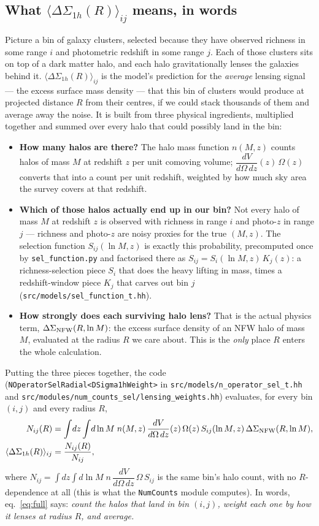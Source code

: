 \documentclass[a4paper, 11pt]{article}
\newcommand{\lnM}{\ln M}
\newcommand{\dVdz}{\dfrac{dV}{d\Omega\,dz}}
\newcommand{\DSnfw}{\Delta\Sigma_{\rm NFW}}
\newcommand{\DSoh}{\Delta\Sigma_{1h}}
\newcommand{\obsij}[1]{\langle \DSoh(#1)\rangle_{ij}}
\begin{document}
\subsection{What \texorpdfstring{$\obsij{R}$}{<DeltaSigma\_1h(R)>\_ij} means, in words}

Picture a bin of galaxy clusters, selected because they have
observed richness in some range $i$ and photometric redshift in
some range $j$. Each of those clusters sits on top of a dark
matter halo, and each halo gravitationally lenses the galaxies
behind it. $\obsij{R}$ is the model's prediction for the
\emph{average} lensing signal --- the excess surface mass density
--- that this bin of clusters would produce at projected distance
$R$ from their centres, if we could stack thousands of them and
average away the noise. It is built from three physical
ingredients, multiplied together and summed over every halo that
could possibly land in the bin:
\begin{itemize}
\item \textbf{How many halos are there?} The halo mass function
      $n(M,z)$ counts halos of mass $M$ at redshift $z$ per unit
      comoving volume; $\dVdz(z)\,\Omega(z)$ converts that into a
      count per unit redshift, weighted by how much sky area the
      survey covers at that redshift.
\item \textbf{Which of those halos actually end up in our bin?}
      Not every halo of mass $M$ at redshift $z$ is observed with
      richness in range $i$ and photo-$z$ in range $j$ --- richness
      and photo-$z$ are noisy proxies for the true $(M,z)$. The
      selection function $S_{ij}(\lnM,z)$ is exactly this
      probability, precomputed once by \texttt{sel\_function.py}
      and factorised there as $S_{ij}=S_i(\lnM,z)\,K_j(z)$: a
      richness-selection piece $S_i$ that does the heavy lifting in
      mass, times a redshift-window piece $K_j$ that carves out
      bin $j$ (\texttt{src/models/sel\_function\_t.hh}).
\item \textbf{How strongly does each surviving halo lens?} That is
      the actual physics term, $\DSnfw(R,\lnM)$: the excess surface
      density of an NFW halo of mass $M$, evaluated at the radius
      $R$ we care about. This is the \emph{only} place $R$ enters
      the whole calculation.
\end{itemize}
Putting the three pieces together, the code
(\texttt{NOperatorSelRadial<DSigma1hWeight>} in
\texttt{src/models/n\_operator\_sel\_t.hh} and
\texttt{src/modules/num\_counts\_sel/lensing\_weights.hh}) evaluates,
for every bin $(i,j)$ and every radius $R$,
\begin{align}
N_{ij}(R) &= \int\! dz \int\! d\lnM\;
n(M,z)\,\dVdz(z)\,\Omega(z)\, S_{ij}(\lnM,z)\,
\DSnfw(R,\lnM),
\notag\\
\obsij{R} &= \frac{N_{ij}(R)}{N_{ij}},
\label{eq:full}
\end{align}
where $N_{ij} = \int dz\int d\lnM\; n\,\dVdz\,\Omega\,S_{ij}$ is the
same bin's halo count, with no $R$-dependence at all (this is what
the \texttt{NumCounts} module computes). In words,
eq.~\eqref{eq:full} says: \emph{count the
halos that land in bin $(i,j)$, weight each one by how it lenses
at radius $R$, and average.}
\end{document}
